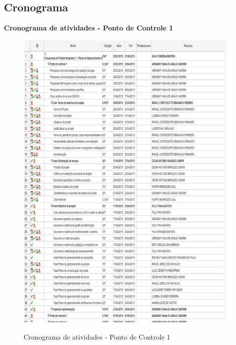   \pagebreak
  \subsection{Cronograma}
   
   \textbf{Cronograma de atividades - Ponto de Controle 1}
   \begin{figure}[!h]
    \centering
    \includegraphics[scale = 0.8]{editaveis/figuras/cronogramaPC1}
    \label{Cronograma de atividades PC1}
    \caption{Cronograma de atividades - Ponto de Controle 1}
   \end{figure}
   \FloatBarrier
   
